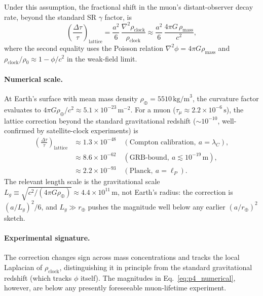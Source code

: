 Under this assumption, the fractional shift in the muon's
distant-observer decay rate, beyond the standard SR
$\gamma$ factor, is
\begin{equation}
    \left(\frac{\Delta \tau}{\tau}\right)_\text{lattice}
        = \frac{a^2}{6}\,\frac{\nabla^2 \rho_\text{clock}}{\rho_\text{clock}}
        \approx \frac{a^2}{6}\,\frac{4\pi G\,\rho_\text{mass}}{c^2},
    \label{eq:p4_shift}
\end{equation}
where the second equality uses the Poisson relation $\nabla^2 \phi = 4\pi G\rho_\text{mass}$
and $\rho_\text{clock}/\rho_0 \approx 1 - \phi/c^2$ in the weak-field
limit.

\paragraph{Numerical scale.}
At Earth's surface with mean mass density $\rho_\oplus = 5510\,\text{kg/m}^3$,
the curvature factor evaluates to $4\pi G\rho_\oplus / c^2 \approx 5.1 \times 10^{-23}\,\text{m}^{-2}$.
For a muon ($\tau_\mu \approx 2.2 \times 10^{-6}\,\text{s}$), the
lattice correction beyond the standard gravitational redshift
($\sim 10^{-10}$, well-confirmed by satellite-clock experiments) is
\begin{align}
    \left(\frac{\Delta\tau}{\tau}\right)_\text{lattice}
        &\approx 1.3 \times 10^{-48}
        \quad (\text{Compton calibration},\ a = \lambda_C),
        \nonumber\\
        &\approx 8.6 \times 10^{-62}
        \quad (\text{GRB-bound},\ a \lesssim 10^{-19}\,\text{m}),
        \label{eq:p4_numerical}\\
        &\approx 2.2 \times 10^{-93}
        \quad (\text{Planck},\ a = \ell_P).
        \nonumber
\end{align}
The relevant length scale is the gravitational scale
$L_g \equiv \sqrt{c^2/(4\pi G\rho_\oplus)} \approx 4.4 \times 10^{11}\,\text{m}$,
not Earth's radius: the correction is $(a/L_g)^2 / 6$, and
$L_g \gg r_\oplus$ pushes the magnitude well below any earlier
$(a/r_\oplus)^2$ sketch.

\paragraph{Experimental signature.}
The correction changes sign across mass concentrations and tracks
the local Laplacian of $\rho_\text{clock}$, distinguishing it
in principle from the standard gravitational redshift (which tracks
$\phi$ itself).  The magnitudes in
Eq.~\eqref{eq:p4_numerical}, however, are below any presently
foreseeable muon-lifetime experiment.

